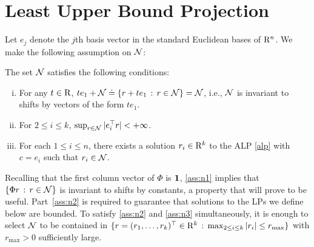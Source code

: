\section{Least Upper Bound Projection}\label{sec:lubp}
Let $e_j$ denote the $j$th basis vector in the standard Euclidean bases of $\mathrm{R}^n$.
We make the following assumption on $\mathcal{N}$:
\begin{assumption}
\label{ass:n}
The set $\mathcal{N}$ satisfies the following conditions:
\begin{enumerate}[(i)]
\item \label{ass:n1}
For any $t\in \mathrm{R}$, $t e_1 + \mathcal{N} \doteq \{ r + t e_1 \,:\, r\in \mathcal{N} \} = \mathcal{N}$, i.e., 
$\mathcal{N}$ is invariant to shifts by vectors of the form $t e_1$.
\item \label{ass:n2}
For $2\le i \le k$, $\sup_{r\in \mathcal{N}} | e_i^\top r | <+\infty$.
\item \label{ass:n3}
For each $1\le i \le n$, there exists a solution $r_i\in \mathrm{R}^k$ to the ALP \eqref{alp} with $c = e_i$ such that
$r_i\in \mathcal{N}$.
\end{enumerate}
\end{assumption}
Recalling that the first column vector of $\Phi$ is $\mathbf{1}$, \eqref{ass:n1} implies that $\{\Phi r \,:\,r\in \mathcal{N} \}$ is invariant to shifts by constants, a property that will prove to be useful.
Part~\eqref{ass:n2} is required to guarantee that solutions to the LPs we define below are bounded.
To satisfy \eqref{ass:n2} and \eqref{ass:n3} simultaneously, it is enough to select $\mathcal{N}$ to be contained in 
$\{ r = (r_1,\dots,r_k)^\top \in \mathrm{R}^k \,:\, \max_{2\le i \le k} |r_i| \le r_{\max} \}$ with $r_{\max}>0$ sufficiently large.

